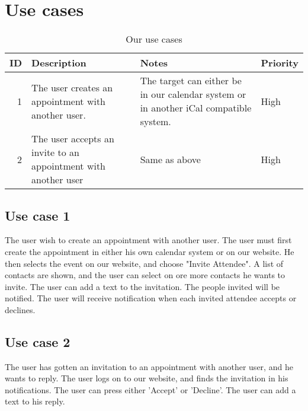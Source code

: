 \section{Use cases}
\begin{table*}[ht]\centering
  \begin{tabularx}{\textwidth}{@{}rXXl@{}}\toprule
    \textbf{ID} & \textbf{Description} & \textbf{Notes} & \textbf{Priority} \\\hline
    1 & The user creates an appointment with another user.             & The
    target can either be in our calendar system or in another iCal compatible
    system. & High \\\hline
    2 & The user accepts an invite to an appointment with another user & Same
    as above
    & High \\
    \bottomrule
  \end{tabularx}
  \caption{Our use cases}
  \label{usecases}\centering%
\end{table*}
\subsection{Use case 1}
The user wish to create an appointment with another user. The user must first create the appointment in either his own calendar system or on our website. He then selects the event on our website, and choose "Invite Attendee". A list of contacts are shown, and the user can select on ore more contacts he wants to invite. The user can add a text to the invitation. The people invited will be notified. The user will receive notification when each invited attendee accepts or declines.
\subsection{Use case 2}
The user has gotten an invitation to an appointment with another user, and he wants to reply.
The user logs on to our website, and finds the invitation in his notifications. The user can press either 'Accept' or 'Decline'. The user can add a text to his reply.